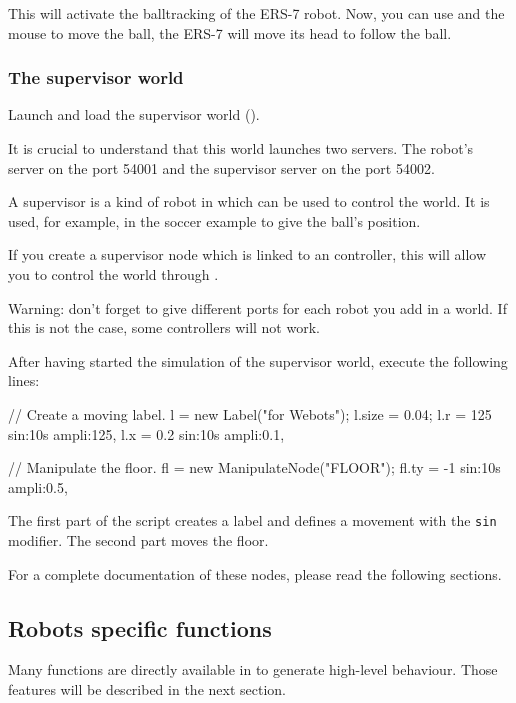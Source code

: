 This will activate the balltracking of the ERS-7 robot.  Now, you can
use  and the mouse to move the ball, the ERS-7 will move
its head to follow the ball.


\subsubsection{The supervisor world}

Launch \webots and load the supervisor world
().

It is crucial to understand that this world launches two \urbi
servers.  The robot's server on the port 54001 and the supervisor
server on the port 54002.

A supervisor is a kind of robot in \webots which can be used to control
the world. It is used, for example, in the \webots soccer example to
give the ball's position.

If you create a supervisor node which is linked to an \urbi
controller, this will allow you to control the world through \urbi.

Warning: don't forget to give different ports for each robot you add
in a \webots world. If this is not the case, some controllers will not
work.

After having started the simulation of the supervisor world, execute
the following lines:


\begin{urbiunchecked}
// Create a moving label.
l = new Label("\urbi for Webots");
l.size = 0.04;
l.r = 125 sin:10s ampli:125,
l.x = 0.2 sin:10s ampli:0.1,

// Manipulate the floor.
fl = new ManipulateNode("FLOOR");
fl.ty = -1 sin:10s ampli:0.5,
\end{urbiunchecked}

The first part of the script creates a label and defines a movement
with the \lstinline|sin| modifier. The second part moves the floor.

For a complete documentation of these nodes, please read the following
sections.

\subsection{Robots specific functions}

Many functions are directly available in \us to generate high-level
behaviour. Those features will be described in the next section.


